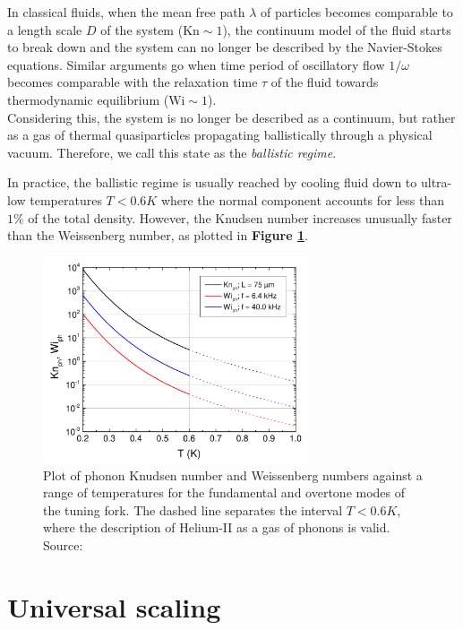 In classical fluids, when the mean free path $\lambda$ of particles becomes comparable to a length scale $D$ of the system ($\text{Kn} \sim 1$), the continuum model of the fluid starts to break down and the system can no longer be described by the Navier-Stokes equations. Similar arguments go when time period of oscillatory flow $1/\omega$ becomes comparable with the relaxation time $\tau$ of the fluid towards thermodynamic equilibrium ($\text{Wi} \sim 1$).\\
Considering this, the system is no longer be described as a continuum, but rather as a gas of thermal quasiparticles propagating ballistically through a physical vacuum. Therefore, we call this state as the \textit{ballistic regime}.

In practice, the ballistic regime is usually reached by cooling fluid down to ultra-low temperatures $T < 0.6\unit{K}$ where the normal component accounts for less than $1\%$ of the total density. However, the Knudsen number increases unusually faster than the Weissenberg number, as plotted in \textbf{Figure \ref{Kn-Wi}}.

\begin{figure}[h]
	\centering
	\includegraphics[width=0.7\textwidth]{graphics/theory/ballistic}
	\caption{Plot of phonon Knudsen number and Weissenberg numbers against a range of temperatures for the fundamental and overtone modes of the tuning fork. The dashed line separates the interval $T < 0.6\unit{K}$, where the description of Helium-II as a gas of phonons is valid. Source:\cite{universal_scaling}}
	\label{Kn-Wi}
\end{figure}

\newpage

\section{Universal scaling}

